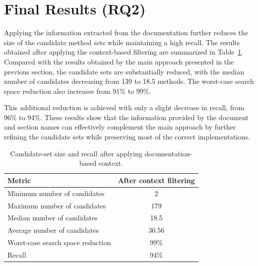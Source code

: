 \section{Final Results (RQ2)}
\label{sec:resultsRQ2}

Applying the information extracted from the documentation further reduces the size of the candidate method sets while maintaining a high recall. The results obtained after applying the context-based filtering are summarized in Table~\ref{tab:rq2_results}. Compared with the results obtained by the main approach presented in the previous section, the candidate sets are substantially reduced, with the median number of candidates decreasing from 139 to 18.5 methods. The worst-case search space reduction also increases from 91\% to 99\%.

This additional reduction is achieved with only a slight decrease in recall, from 96\% to 94\%. These results show that the information provided by the document and section names can effectively complement the main approach by further refining the candidate sets while preserving most of the correct implementations.

\begin{table}[h]
\centering
\caption{Candidate-set size and recall after applying documentation-based context.}
\label{tab:rq2_results}
\begin{tabular}{lc}
\hline
\textbf{Metric} & \textbf{After context filtering} \\
\hline
Minimum number of candidates & 2 \\
Maximum number of candidates & 179 \\
Median number of candidates & 18.5 \\
Average number of candidates & 30.56 \\
Worst-case search space reduction & 99\% \\
Recall & 94\% \\
\hline
\end{tabular}
\end{table}